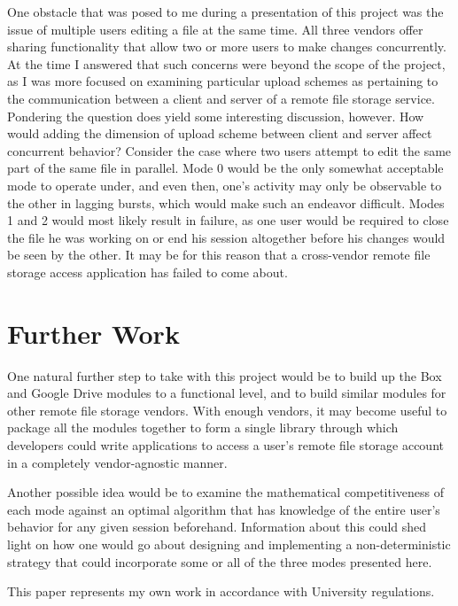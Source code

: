 \documentclass[pageno]{jpaper}
\begin{document}
One obstacle that was posed to me during a presentation of this project was the issue of multiple users editing a file at the same time. All three vendors offer sharing functionality that allow two or more users to make changes concurrently. At the time I answered that such concerns were beyond the scope of the project, as I was more focused on examining particular upload schemes as pertaining to the communication between a client and server of a remote file storage service. Pondering the question does yield some interesting discussion, however. How would adding the dimension of upload scheme between client and server affect concurrent behavior? Consider the case where two users attempt to edit the same part of the same file in parallel. Mode 0 would be the only somewhat acceptable mode to operate under, and even then, one's activity may only be observable to the other in lagging bursts, which would make such an endeavor difficult. Modes 1 and 2 would most likely result in failure, as one user would be required to close the file he was working on or end his session altogether before his changes would be seen by the other. It may be for this reason that a cross-vendor remote file storage access application has failed to come about.

\section{Further Work}
One natural further step to take with this project would be to build up the Box and Google Drive modules to a functional level, and to build similar modules for other remote file storage vendors. With enough vendors, it may become useful to package all the modules together to form a single library through which developers could write applications to access a user's remote file storage account in a completely vendor-agnostic manner.

Another possible idea would be to examine the mathematical competitiveness of each mode against an optimal algorithm that has knowledge of the entire user's behavior for any given session beforehand. Information about this could shed light on how one would go about designing and implementing a non-deterministic strategy that could incorporate some or all of the three modes presented here. 

\vspace{1cm}
This paper represents my own work in accordance with University regulations.
\vspace{1cm}
\end{document}
